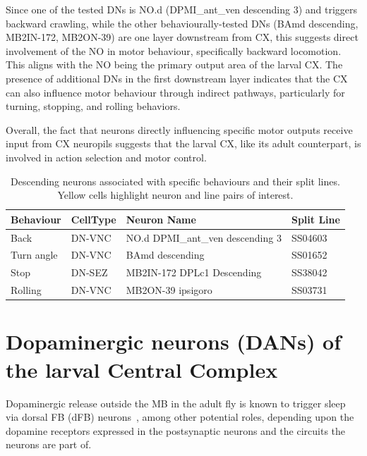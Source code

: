     Since one of the tested DNs is NO.d (DPMI\_ant\_ven descending 3) and triggers backward crawling, while the other behaviourally-tested DNs (BAmd descending, MB2IN-172, MB2ON-39) are one layer downstream from CX, this suggests direct involvement of the NO in motor behaviour, specifically backward locomotion. This aligns with the NO being the primary output area of the larval CX. The presence of additional DNs in the first downstream layer indicates that the CX can also influence motor behaviour through indirect pathways, particularly for turning, stopping, and rolling behaviors.

    Overall, the fact that neurons directly influencing specific motor outputs receive input from CX neuropils suggests that the larval CX, like its adult counterpart, is involved in action selection and motor control.

    \begin{table}[H]
        \centering
        \begin{tabular}{l l p{} l}
            \toprule
            \textbf{Behaviour} & \textbf{CellType} & \textbf{Neuron Name} & \textbf{Split Line} \\
            \midrule
            Back & DN-VNC & \cellcolor{cxhl} NO.d DPMI\_ant\_ven descending 3 & \cellcolor{cxhl} SS04603 \\
            Turn angle & DN-VNC & \cellcolor{cxhl} BAmd descending & \cellcolor{cxhl} SS01652 \\
            Stop & DN-SEZ & \cellcolor{cxhl} MB2IN-172 DPLc1 Descending & \cellcolor{cxhl} SS38042 \\
            Rolling & DN-VNC & \cellcolor{cxhl} MB2ON-39 ipsigoro & \cellcolor{cxhl} SS03731 \\
            \bottomrule
        \end{tabular}
        \caption[Behaviour of CX Descending Neurons]{Descending neurons associated with specific behaviours and their split lines. Yellow cells highlight neuron and line pairs of interest.}
        \label{behaviourCXdescending}
    \end{table}

 \section{Dopaminergic neurons (DANs) of the larval Central Complex}
\label{CXDANs}
    Dopaminergic release outside the MB in the adult fly is known to trigger sleep via dorsal FB (dFB) neurons~\citep{pimentel2016sleep}, among other potential roles, depending upon the dopamine receptors expressed in the postsynaptic neurons and the circuits the neurons are part of. 

